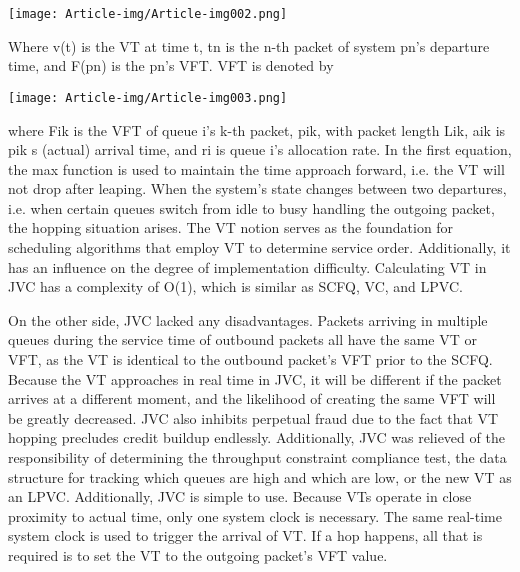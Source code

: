  \texttt{[image: Article-img/Article-img002.png]} 

Where v(t) is the VT at time t, tn is the n-th packet of system pn{}'s departure time, and F(pn) is the pn's VFT. VFT is denoted by

 \texttt{[image: Article-img/Article-img003.png]} 

where Fik is the VFT of queue i's k-th packet, pik, with packet length Lik, aik is pik s (actual) arrival time, and ri is queue i's allocation rate. In the first equation, the max function is used to maintain the time approach forward, i.e. the VT will not drop after leaping. When the system's state changes between two departures, i.e. when certain queues switch from idle to busy handling the outgoing packet, the hopping situation arises. The VT notion serves as the foundation for scheduling algorithms that employ VT to determine service order. Additionally, it has an influence on the degree of implementation difficulty. Calculating VT in JVC has a complexity of O(1), which is similar as SCFQ, VC, and LPVC.

On the other side, JVC lacked any disadvantages. Packets arriving in multiple queues during the service time of outbound packets all have the same VT or VFT, as the VT is identical to the outbound packet's VFT prior to the SCFQ. Because the VT approaches in real time in JVC, it will be different if the packet arrives at a different moment, and the likelihood of creating the same VFT will be greatly decreased. JVC also inhibits perpetual fraud due to the fact that VT hopping precludes credit buildup endlessly. Additionally, JVC was relieved of the responsibility of determining the throughput constraint compliance test, the data structure for tracking which queues are high and which are low, or the new VT as an LPVC. Additionally, JVC is simple to use. Because VTs operate in close proximity to actual time, only one system clock is necessary. The same real-time system clock is used to trigger the arrival of VT. If a hop happens, all that is required is to set the VT to the outgoing packet's VFT value.
